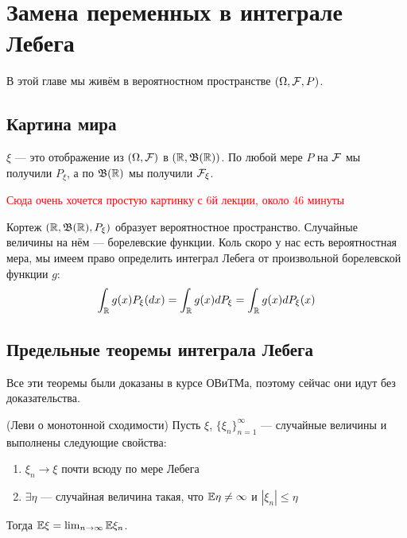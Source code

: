 \section{Замена переменных в интеграле Лебега}

\begin{note}
	В этой главе мы живём в вероятностном пространстве $(\Omega, \mathcal{F}, P)$.
\end{note}

\subsection{Картина мира}

\begin{note}
	$\xi$ --- это отображение из $(\Omega, \mathcal{F})$ в $(\mathbb{R}, \mathfrak{B}(\mathbb{R}))$. По любой мере $P$ на $\mathcal{F}$ мы получили $P_\xi$, а по $\mathfrak{B}(\mathbb{R})$ мы получили $\mathcal{F}_\xi$.
	
	\textcolor{red}{Сюда очень хочется простую картинку с 6й лекции, около 46 минуты}
	
	Кортеж $(\mathbb{R}, \mathfrak{B}(\mathbb{R}), P_\xi)$ образует вероятностное пространство. Случайные величины на нём --- борелевские функции. Коль скоро у нас есть вероятностная мера, мы имеем право определить интеграл Лебега от произвольной борелевской функции $g$:
	\[
		\int_{\mathbb{R}} g(x)P_\xi(dx) = \int_{\mathbb{R}} g(x)dP_\xi = \int_{\mathbb{R}} g(x)dP_\xi(x)
	\]
\end{note}

\subsection{Предельные теоремы интеграла Лебега}

\begin{note}
	Все эти теоремы были доказаны в курсе ОВиТМа, поэтому сейчас они идут без доказательства.
\end{note}

\begin{theorem} (Леви о монотонной сходимости)
	Пусть $\xi$, $\{\xi_n\}_{n = 1}^\infty$ --- случайные величины и выполнены следующие свойства:
	\begin{enumerate}
		\item $\xi_n \to \xi$ почти всюду по мере Лебега
		
		\item $\exists \eta$ --- случайная величина такая, что $\mathbb{E}\eta \neq \infty$ и $|\xi_n| \le \eta$
	\end{enumerate}
	Тогда $\mathbb{E}\xi = \lim_{n \to \infty} \mathbb{E}\xi_n$.
\end{theorem}

